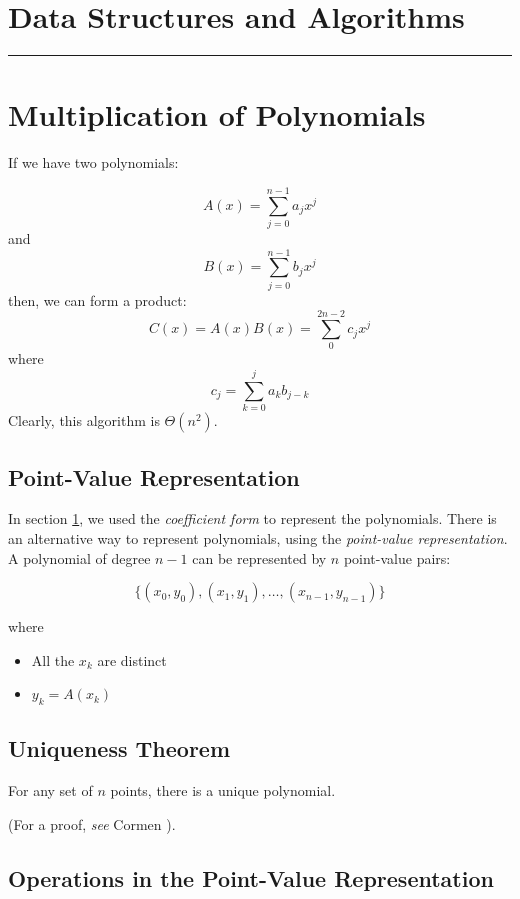 



\newcommand{\HR}{\rule{12cm}{0.5mm}}
%

\section*{Data Structures and Algorithms}
\HR
\setcounter{section}{11}
\section{Multiplication of Polynomials}
\label{sec:poly-mult}
If we have two polynomials:

\[A(x) = \sum_{j=0}^{n-1}a_{j}x^{j}   \]
and
\[B(x) = \sum_{j=0}^{n-1}b_{j}x^{j}   \]
then, we can form a product:
\[C(x) = A(x)B(x) = \sum_{0}^{2n-2}c_{j}x^{j} \]
where
\[c_{j} = \sum_{k=0}^{j}a_{k}b_{j-k} \]
Clearly, this algorithm is $\Theta(n^2)$.

\newcommand{\PVR}{{Point-Value Representation}}
\subsection{\PVR}

In section \ref{sec:poly-mult}, we used the
{\it coefficient form} to represent the polynomials.
There is an alternative way to represent
polynomials, using the {\it point-value representation}.
A polynomial of degree $n-1$ can be represented by
$n$ point-value pairs:

\[ \{ (x_0,y_0), (x_1,y_1), \ldots , (x_{n-1},y_{n-1}) \} \]

where
\begin{itemize}
\item All the $x_k$ are distinct
\item $y_k = A(x_k)$
\end{itemize}

\subsection{Uniqueness Theorem}

For any set of $n$ points, there is a unique polynomial.

(For a proof, {\it see} Cormen \ETAL).

\subsection{Operations in the \PVR} 

